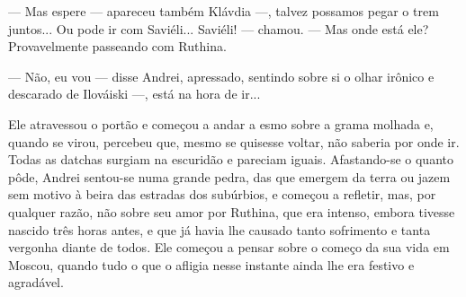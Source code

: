 --- Mas espere --- apareceu também Klávdia ---, talvez possamos pegar o
trem juntos... Ou pode ir com Saviéli... Saviéli! --- chamou. --- Mas
onde está ele? Provavelmente passeando com Ruthina.

--- Não, eu vou --- disse Andrei, apressado, sentindo sobre si o olhar
irônico e descarado de Ilováiski ---, está na hora de ir...

Ele atravessou o portão e começou a andar a esmo sobre a grama molhada
e, quando se virou, percebeu que, mesmo se quisesse voltar, não saberia
por onde ir. Todas as datchas surgiam na escuridão e pareciam iguais.
Afastando-se o quanto pôde, Andrei sentou-se numa grande pedra, das que
emergem da terra ou jazem sem motivo à beira das estradas dos subúrbios,
e começou a refletir, mas, por qualquer razão, não sobre seu amor por
Ruthina, que era intenso, embora tivesse nascido três horas antes, e que
já havia lhe causado tanto sofrimento e tanta vergonha diante de todos.
Ele começou a pensar sobre o começo da sua vida em Moscou, quando tudo o
que o afligia nesse instante ainda lhe era festivo e agradável.

